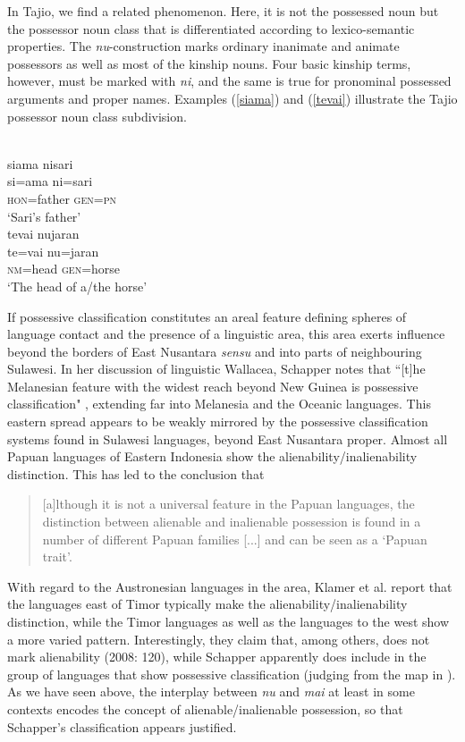 In Tajio, we find a related phenomenon. Here, it is not the possessed noun but the possessor noun class that is differentiated according to lexico-semantic properties. The \textit{nu}-construction marks ordinary inanimate and animate possessors as well as most of the kinship nouns. Four basic kinship terms, however, must be marked with \textit{ni}, and the same is true for pronominal possessed arguments and proper names. Examples (\ref{siama}) and (\ref{tevai}) illustrate the Tajio possessor noun class subdivision.

\ea
{}\\
\ea \label{siama}
\glll siama nisari \\
si=ama ni=sari\\
\textsc{hon}=father \textsc{gen}=\textsc{pn}\\
\glt ‘Sari's father’
\ex \label{tevai}
\langinfo{}{}{\citealt[]{}}\\
\gll tevai nujaran \\
te=vai nu=jaran\\
\textsc{nm}=head \textsc{gen}=horse\\
\glt ‘The head of a/the horse’
\z
\z

If possessive classification constitutes an areal feature defining spheres of language contact and the presence of a linguistic area, this area exerts influence beyond the borders of East Nusantara \textit{sensu} \citet{klamer2008east} and into parts of neighbouring Sulawesi. In her discussion of linguistic Wallacea, Schapper notes that ``[t]he Melanesian feature with the widest reach beyond New Guinea is possessive classification" \citep[108]{schapper2015wallacea}, extending far into Melanesia and the Oceanic languages. This eastern spread appears to be weakly mirrored by the possessive classification systems found in Sulawesi languages, beyond East Nusantara proper. Almost all Papuan languages of Eastern Indonesia show the alienability/inalienability distinction. This has led \citet[120]{klamer2008east} to the conclusion that

\begin{quote}[a]lthough it is not a universal feature in the Papuan languages,
the distinction between alienable and inalienable possession is found in a number of different Papuan families [...] and can be seen as a `Papuan trait’.\end{quote}

With regard to the Austronesian languages in the area, Klamer et al. report that the languages east of Timor typically make the alienability/inalienability distinction, while the Timor languages as well as the languages to the west show a more varied pattern. Interestingly, they claim that, among others,  does not mark alienability (2008: 120), while Schapper apparently does include  in the group of languages that show possessive classification (judging from the map in \citealt[110]{schapper2009bunaq}). As we have seen above, the interplay between \textit{nu} and \textit{mai} at least in some contexts encodes the concept of alienable/inalienable possession, so that Schapper's classification appears justified.


